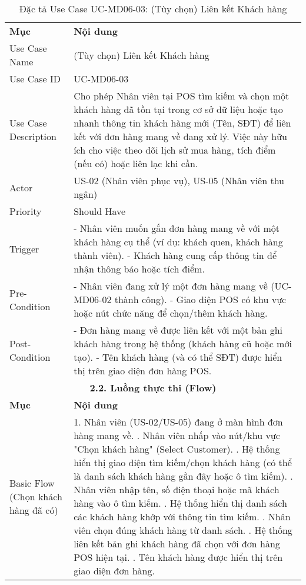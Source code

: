 \begin{longtable}{|m{4cm}|p{11cm}|}
\caption{Đặc tả Use Case UC-MD06-03: (Tùy chọn) Liên kết Khách hàng} \label{tab:uc_md06_03} \\
\hline

\endhead %
\hline
\endfoot %
\hline
\endlastfoot %
\multicolumn{2}{|c|}{\textbf{2.1. Tóm tắt (Summary)}} \\
\hline
\textbf{Mục} & \textbf{Nội dung} \\
\hline
Use Case Name & (Tùy chọn) Liên kết Khách hàng \\
\hline
Use Case ID & UC-MD06-03 \\
\hline
Use Case Description & Cho phép Nhân viên tại POS tìm kiếm và chọn một khách hàng đã tồn tại trong cơ sở dữ liệu hoặc tạo nhanh thông tin khách hàng mới (Tên, SĐT) để liên kết với đơn hàng mang về đang xử lý. Việc này hữu ích cho việc theo dõi lịch sử mua hàng, tích điểm (nếu có) hoặc liên lạc khi cần. \\
\hline
Actor & US-02 (Nhân viên phục vụ), US-05 (Nhân viên thu ngân) \\
\hline
Priority & Should Have \\
\hline
Trigger & - Nhân viên muốn gắn đơn hàng mang về với một khách hàng cụ thể (ví dụ: khách quen, khách hàng thành viên). \newline - Khách hàng cung cấp thông tin để nhận thông báo hoặc tích điểm. \\
\hline
Pre-Condition & - Nhân viên đang xử lý một đơn hàng mang về (UC-MD06-02 thành công). \newline - Giao diện POS có khu vực hoặc nút chức năng để chọn/thêm khách hàng. \\
\hline
Post-Condition & - Đơn hàng mang về được liên kết với một bản ghi khách hàng trong hệ thống (khách hàng cũ hoặc mới tạo). \newline - Tên khách hàng (và có thể SĐT) được hiển thị trên giao diện đơn hàng POS. \\
\hline
\multicolumn{2}{|c|}{\textbf{2.2. Luồng thực thi (Flow)}} \\
\hline
\textbf{Mục} & \textbf{Nội dung} \\
\hline
Basic Flow (Chọn khách hàng đã có) & 1. Nhân viên (US-02/US-05) đang ở màn hình đơn hàng mang về. \newline 2. Nhân viên nhấp vào nút/khu vực "Chọn khách hàng" (Select Customer). \newline 3. Hệ thống hiển thị giao diện tìm kiếm/chọn khách hàng (có thể là danh sách khách hàng gần đây hoặc ô tìm kiếm). \newline 4. Nhân viên nhập tên, số điện thoại hoặc mã khách hàng vào ô tìm kiếm. \newline 5. Hệ thống hiển thị danh sách các khách hàng khớp với thông tin tìm kiếm. \newline 6. Nhân viên chọn đúng khách hàng từ danh sách. \newline 7. Hệ thống liên kết bản ghi khách hàng đã chọn với đơn hàng POS hiện tại. \newline 8. Tên khách hàng được hiển thị trên giao diện đơn hàng. \\

\end{longtable}
